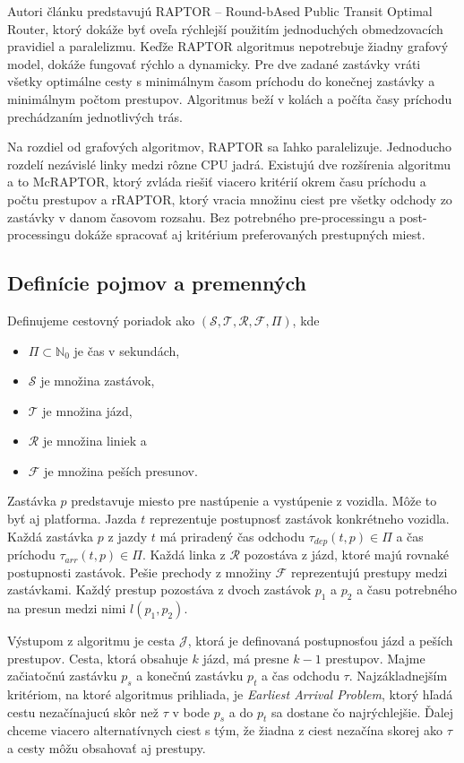 Autori článku \cite{raptor} predstavujú RAPTOR – Round-bAsed Public Transit Optimal Router, ktorý dokáže byť oveľa rýchlejší použitím jednoduchých obmedzovacích pravidiel a paralelizmu. Keďže RAPTOR algoritmus nepotrebuje žiadny grafový model, dokáže fungovať rýchlo a dynamicky. Pre dve zadané zastávky vráti všetky optimálne cesty s minimálnym časom príchodu do konečnej zastávky a minimálnym počtom prestupov. Algoritmus beží v kolách a počíta časy príchodu prechádzaním jednotlivých trás.

Na rozdiel od grafových algoritmov, RAPTOR sa ľahko paralelizuje. Jednoducho rozdelí nezávislé linky medzi rôzne CPU jadrá. Existujú dve rozšírenia algoritmu a to McRAPTOR, ktorý zvláda riešiť viacero kritérií okrem času príchodu a počtu prestupov a rRAPTOR, ktorý vracia množinu ciest pre všetky odchody zo zastávky v danom časovom rozsahu. Bez potrebného pre-processingu a post-processingu dokáže spracovať aj kritérium preferovaných prestupných miest.

\subsection{Definície pojmov a premenných}

Definujeme cestovný poriadok ako $(\mathcal{S,T,R,F},\Pi)$, kde 
\begin{itemize}
\item $\Pi \subset \mathbb{N}_{0}$ je čas v sekundách, 
\item $\mathcal{S}$ je množina zastávok,
\item $\mathcal{T}$ je množina jázd, 
\item $\mathcal{R}$ je množina liniek a 
\item $\mathcal{F}$ je množina peších presunov.
\end{itemize}

Zastávka $p$ predstavuje miesto pre nastúpenie a vystúpenie z vozidla. Môže to byť aj platforma. Jazda $t$ reprezentuje postupnosť zastávok konkrétneho vozidla. Každá zastávka $p$ z jazdy $t$ má priradený čas odchodu $\tau_{dep}(t, p) \in \Pi$ a čas príchodu $\tau_{arr}(t, p) \in \Pi$. Každá linka z $\mathcal{R}$ pozostáva z jázd, ktoré majú rovnaké postupnosti zastávok. Pešie prechody z množiny $\mathcal{F}$ reprezentujú prestupy medzi zastávkami. Každý prestup pozostáva z dvoch zastávok $p_1$ a $p_2$ a času potrebného na presun medzi nimi $l(p_1, p_2)$. 

Výstupom z algoritmu je cesta $\mathcal{J}$, ktorá je definovaná postupnosťou jázd a peších prestupov. Cesta, ktorá obsahuje $k$ jázd, má presne $k-1$ prestupov. Majme začiatočnú zastávku $p_s$ a konečnú zastávku $p_t$ a čas odchodu $\tau$. Najzákladnejším kritériom, na ktoré algoritmus prihliada, je \textit{Earliest Arrival Problem}, ktorý hľadá cestu nezačínajucú skôr než $\tau$ v bode $p_s$ a do $p_t$ sa dostane čo najrýchlejšie. Ďalej chceme viacero alternatívnych ciest s tým, že žiadna z ciest nezačína skorej ako $\tau$ a cesty môžu obsahovať aj prestupy. 

